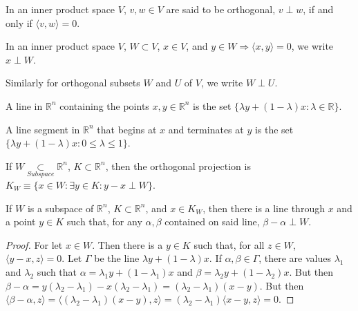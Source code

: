 \documentclass[crop=false,class=article,oneside]{standalone}
\begin{document}
            \begin{definition}
            In an inner product space $V$, $v,w\in V$ are said to be orthogonal, $v\perp w$, if and only if $\langle v,w \rangle = 0$.
            \end{definition}
            \begin{notation}
            In an inner product space $V$, $W\subset V$, $x\in V$, and $y\in W \Rightarrow \langle x,y\rangle = 0$, we write $x\perp W$.
            \end{notation}
            \begin{notation}
            Similarly for orthogonal subsets $W$ and $U$ of $V$, we write $W\perp U$.
            \end{notation}
            \begin{definition}
            A line in $\mathbb{R}^n$ containing the points $x,y\in \mathbb{R}^n$ is the set $\{\lambda y + (1-\lambda)x: \lambda \in \mathbb{R}\}$.
            \end{definition}
            \begin{definition}
            A line segment in $\mathbb{R}^n$ that begins at $x$ and terminates at $y$ is the set $\{\lambda y + (1-\lambda)x: 0\leq \lambda \leq 1 \}$.
            \end{definition}
            \begin{definition}
            If $W\underset{Subspace}\subset\mathbb{R}^n$, $K \subset \mathbb{R}^n$, then the orthogonal projection is $K_{W}\equiv\{x\in W: \exists y\in K: y-x \perp W\}$.
            \end{definition}
            \begin{theorem}
            If $W$ is a subspace of $\mathbb{R}^n$, $K \subset \mathbb{R}^n$, and $x\in K_{W}$, then there is a line through $x$ and a point $y\in K$ such that, for any $\alpha, \beta$ contained on said line, $\beta-\alpha \perp W$.
            \end{theorem}
            \begin{proof}
            For let $x\in W$. Then there is a $y\in K$ such that, for all $z\in W$, $\langle y-x,z\rangle = 0$. Let $\Gamma$ be the line $\lambda y + (1-\lambda)x$. If $\alpha,\beta \in \Gamma$, there are values $\lambda_1$ and $\lambda_2$ such that $\alpha = \lambda_1 y+ (1-\lambda_1)x$ and $\beta = \lambda_2 y +(1-\lambda_2)x$. But then $\beta-\alpha = y(\lambda_2-\lambda_1)-x(\lambda_2-\lambda_1) = (\lambda_2-\lambda_1)(x-y)$. But then $\langle \beta - \alpha,z\rangle = \langle (\lambda_2-\lambda_1)(x-y),z\rangle = (\lambda_2-\lambda_1)\langle x-y,z \rangle = 0$.
            \end{proof}
\end{document}
